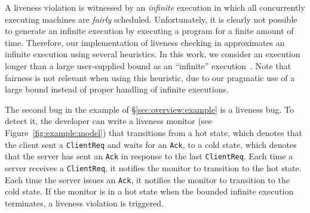 A liveness violation is witnessed by an \emph{infinite} execution in which all concurrently executing \psharp machines are \emph{fairly} scheduled. Unfortunately, it is clearly not possible to generate an infinite execution by executing a program for a finite amount of time. Therefore, our implementation of liveness checking in \psharp approximates an infinite execution using several heuristics. In this work, we consider an execution longer than a large user-supplied bound as an ``infinite'' execution~\cite{killian2007life, musuvathi2008fair}. Note that fairness is not relevant when using this heuristic, due to our pragmatic use of a large bound instead of proper handling of infinite executions.


The second bug in the example of \S\ref{sec:overview:example} is a liveness bug. To detect it, the developer can write a liveness monitor (see Figure~\ref{fig:example:model}) that transitions from a hot state, which denotes that the client sent a \texttt{ClientReq} and waits for an \texttt{Ack}, to a cold state, which denotes that the server has sent an \texttt{Ack} in response to the last \texttt{ClientReq}. Each time a server receives a \texttt{ClientReq}, it notifies the monitor to transition to the hot state. Each time the server issues an \texttt{Ack}, it notifies the monitor to transition to the cold state. If the monitor is in a hot state when the bounded infinite execution terminates, a liveness violation is triggered.



